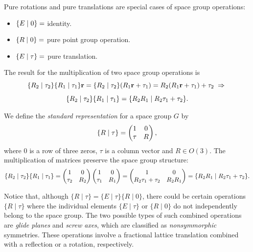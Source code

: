 Pure rotations and pure translations are special cases of space group operations:
\begin{itemize}
\item $\{ E \mid 0 \} =$ identity.
\item $\{ R \mid 0 \} =$ pure point group operation.
\item $\{ E \mid \tau \} =$ pure translation.
\end{itemize}

The result for the multiplication of two space group operations is
$$
\{ R_2 \mid \tau_2 \} \{ R_1 \mid \tau_1 \} {\vb{r}} = \{ R_2 \mid \tau_2 \} (R_1 {\vb{r}} + \tau_1) =
R_2(R_1 {\vb{r}} + \tau_1) + \tau_2 \; \Rightarrow \;
$$
\begin{equation} \label{eq:multiplication_two_space_group_elements}
\{ R_2 \mid \tau_2 \} \{ R_1 \mid \tau_1 \} = \{ R_2 R_1 \mid R_2\tau_1 + \tau_2 \}.
\end{equation}

\begin{definition} \label{def:matrixrep_spacegroup}
We define the \textit{standard representation} for a space group $G$ by
\begin{equation} \label{eq:spacegroup-rep}
\{ R \mid \tau \} =
\begin{pmatrix}
1 & 0 \\
\tau & R
\end{pmatrix},
\end{equation}
where $0$ is a row of three zeros, $\tau$ is a column vector and $R \in O(3)$. The multiplication of matrices preserve the space group structure:
\begin{equation} \label{eq:multiplication_two_space_group_elements_matrix}
\{ R_2 \mid \tau_2 \} \{ R_1 \mid \tau_1 \} =
\begin{pmatrix}
1 & 0 \\
\tau_2 & R_2
\end{pmatrix}
\begin{pmatrix}
1 & 0 \\
\tau_1 & R_1
\end{pmatrix} =
\begin{pmatrix}
1 & 0 \\
R_2\tau_1 + \tau_2 & R_2 R_1
\end{pmatrix} =
\{ R_2 R_1 \mid R_2\tau_1 + \tau_2 \}.
\end{equation}
\end{definition}

\n

Notice that, although \(\{R \mid \tau\} = \{E \mid \tau\} \{R \mid 0\}\), there could be certain operations \(\{R \mid \tau\}\) where the individual elements \(\{E \mid \tau\}\) or \(\{R \mid 0\}\) do not independently belong to the space group. The two possible types of such combined operations are \textit{glide planes} and \textit{screw axes}, which are classified as \textit{nonsymmorphic} symmetries. These operations involve a fractional lattice translation combined with a reflection or a rotation, respectively.

